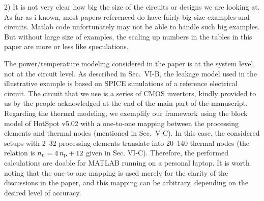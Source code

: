 \begin{reviewer}
2) It is not very clear how big the size of the circuits or designs we are looking at.
As far as i known, most papers referenced do have fairly big size examples and circuits. Matlab code unfortunately may not be able to handle such big examples.
But without large size of examples, the scaling up numbers in the tables in this paper are more or less like speculations.
\end{reviewer}
\begin{authors}
The power/temperature modeling considered in the paper is at the system level, not at the circuit level.
As described in Sec.~VI-B, the leakage model used in the illustrative example is based on SPICE simulations of a reference electrical circuit.
The circuit that we use is a series of CMOS invertors, kindly provided to us by the people acknowledged at the end of the main part of the manuscript.
Regarding the thermal modeling, we exemplify our framework using the block model of HotSpot v5.02 with a one-to-one mapping between the processing elements and thermal nodes (mentioned in Sec.~V-C).
In this case, the considered setups with 2--32 processing elements translate into 20--140 thermal nodes (the relation is ${n_\text{n}} = 4 \, {n_\text{p}} + 12$ given in Sec. VI-C).
Therefore, the performed calculations are doable for MATLAB running on a personal laptop.
It is worth noting that the one-to-one mapping is used merely for the clarity of the discussions in the paper, and this mapping can be arbitrary, depending on the desired level of accuracy.


\end{authors}

